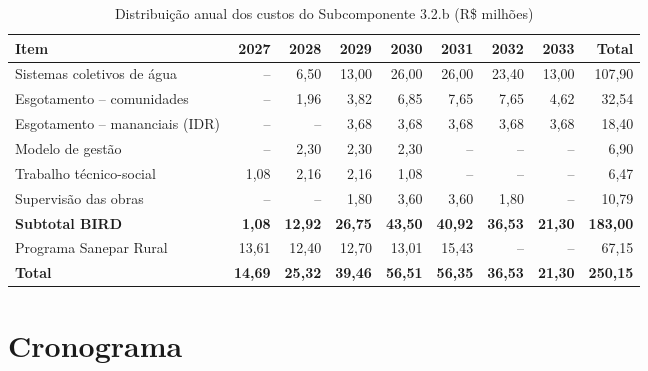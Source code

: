 \begin{table}[H]
\centering
\caption{Distribuição anual dos custos do Subcomponente 3.2.b (R\$ milhões)}
\label{tab:custos-anuais}
\footnotesize
\renewcommand{\arraystretch}{1.2}
\begin{adjustbox}{max width=\linewidth}
\begin{tabular}{lrrrrrrrr}
\toprule
\textbf{Item} & \textbf{2027} & \textbf{2028} & \textbf{2029} & \textbf{2030} &
\textbf{2031} & \textbf{2032} & \textbf{2033} & \textbf{Total} \\
\midrule
Sistemas coletivos de água & -- & 6,50 & 13,00 & 26,00 & 26,00 & 23,40 & 13,00 & 107,90 \\
Esgotamento -- comunidades & -- & 1,96 & 3,82 & 6,85 & 7,65 & 7,65 & 4,62 & 32,54 \\
Esgotamento -- mananciais (IDR) & -- & -- & 3,68 & 3,68 & 3,68 & 3,68 & 3,68 & 18,40 \\
Modelo de gestão & -- & 2,30 & 2,30 & 2,30 & -- & -- & -- & 6,90 \\
Trabalho técnico-social & 1,08 & 2,16 & 2,16 & 1,08 & -- & -- & -- & 6,47 \\
Supervisão das obras & -- & -- & 1,80 & 3,60 & 3,60 & 1,80 & -- & 10,79 \\
\midrule
\textbf{Subtotal BIRD} & \textbf{1,08} & \textbf{12,92} & \textbf{26,75} & \textbf{43,50} &
  \textbf{40,92} & \textbf{36,53} & \textbf{21,30} & \textbf{183,00} \\
\midrule
Programa Sanepar Rural & 13,61 & 12,40 & 12,70 & 13,01 & 15,43 & -- & -- & 67,15 \\
\midrule
\textbf{Total} & \textbf{14,69} & \textbf{25,32} & \textbf{39,46} & \textbf{56,51} &
  \textbf{56,35} & \textbf{36,53} & \textbf{21,30} & \textbf{250,15} \\
\bottomrule
\end{tabular}
\end{adjustbox}
\end{table}

\FloatBarrier
\section{Cronograma}
\label{sec:cronograma}

